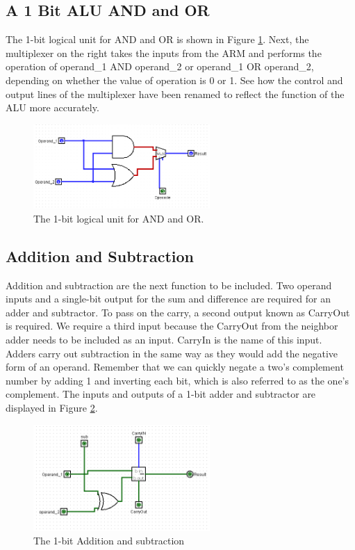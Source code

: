 \documentclass[a4paper,12pt,english]{report}
\begin{document}
\subsection{A 1 Bit ALU  AND and OR}
The 1-bit logical unit for AND and OR is shown in Figure \ref{ref: 1bit and or}. Next, the multiplexer on the right takes the inputs from the ARM and performs the operation of operand\_1 AND operand\_2 or operand\_1 OR operand\_2, depending on whether the value of operation is 0 or 1. See how the control and output lines of the multiplexer have been renamed to reflect the function of the ALU more accurately.
 \begin{figure}[ht]
	\centering
	\includegraphics[width=0.6\textwidth]{and_or} %
	\caption{The 1-bit logical unit for AND and OR.}
	\label{ref: 1bit and or}
\end{figure}
\subsection{Addition and Subtraction}
Addition and subtraction are the next function to be included. Two operand inputs and a single-bit output for the sum and difference are required for an adder and subtractor. To pass on the carry, a second output known as CarryOut is required. We require a third input because the CarryOut from the neighbor adder needs to be included as an input. CarryIn is the name of this input.\\
Adders carry out subtraction in the same way as they would add the negative form of an operand. Remember that we can quickly negate a two's complement number by adding 1 and inverting each bit, which is also referred to as the one's complement. The inputs and outputs of a 1-bit adder and subtractor are displayed in Figure \ref{ref: 1bit and}.
 \begin{figure}[ht]
	\centering
	\includegraphics[width=0.6\textwidth]{add_sub} %
	\caption{The 1-bit Addition and subtraction}
	\label{ref: 1bit and}
	\end{figure}
 \newpage
\end{document}

